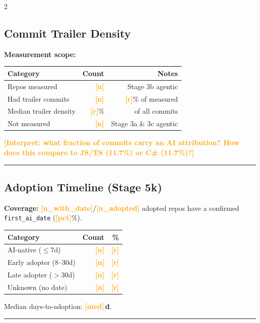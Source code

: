 \documentclass[10pt,a4paper]{article}
\newcommand{\FILLIN}[1]{\textcolor{orange}{\textbf{[#1]}}}
\begin{document}
\begin{multicols}{2}
\columnbreak

\subsection*{Commit Trailer Density}

\textbf{Measurement scope:}

\vspace{2pt}
\begin{tabular}{@{}lrr@{}}
\toprule
Category & Count & Notes \\
\midrule
Repos measured        & \FILLIN{n} & Stage 3b agentic \\
Had trailer commits   & \FILLIN{n} & \FILLIN{r}\% of measured \\
Median trailer density & \FILLIN{r}\% & of all commits \\
Not measured          & \FILLIN{n} & Stage 3a \& 3c agentic \\
\bottomrule
\end{tabular}

\vspace{2pt}
{\small \FILLIN{Interpret: what fraction of commits carry an AI attribution?
How does this compare to JS/TS (11.7\%) or C\# (11.7\%)?}}

\vspace{3pt}
\hrule
\vspace{3pt}

\subsection*{Adoption Timeline (Stage 5k)}
\textbf{Coverage:} \FILLIN{n\_with\_date}/\FILLIN{n\_adopted} adopted repos
have a confirmed \texttt{first\_ai\_date} (\FILLIN{pct}\%).

\vspace{2pt}
\begin{tabular}{@{}lrr@{}}
\toprule
Category & Count & \% \\
\midrule
AI-native ($\leq$7d)   & \FILLIN{n} & \FILLIN{r} \\
Early adopter (8--30d) & \FILLIN{n} & \FILLIN{r} \\
Late adopter ($>$30d)  & \FILLIN{n} & \FILLIN{r} \\
Unknown (no date)      & \FILLIN{n} & \FILLIN{r} \\
\bottomrule
\end{tabular}

\vspace{2pt}
Median days-to-adoption: \textbf{\FILLIN{med}\,d}.

\end{multicols}

\vspace{6pt}
\hrule
\vspace{6pt}
\end{document}
